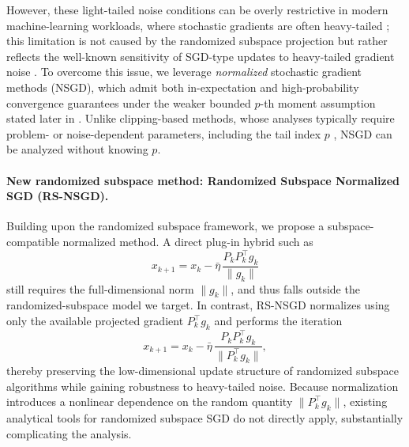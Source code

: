 \documentclass[10pt]{article}
\begin{document}
However, these light-tailed noise conditions can be overly restrictive in modern machine-learning workloads, where stochastic gradients are often heavy-tailed \cite{simsekli2019}; this limitation is not caused by the randomized subspace projection but rather reflects the well-known sensitivity of SGD-type updates to heavy-tailed gradient noise \cite{nguyen2019,hodgkinson2021}.
To overcome this issue, we leverage \emph{normalized} stochastic gradient methods (NSGD),
which admit both in-expectation and high-probability convergence guarantees under the weaker bounded $p$-th moment
assumption stated later in  \cite{huebler2025}.
Unlike clipping-based methods, whose analyses typically require problem- or noise-dependent parameters,
including the tail index $p$ \cite{zhang2020clipped,nguyen2023}, NSGD can be analyzed without knowing $p$.
\paragraph{New randomized subspace method: Randomized Subspace Normalized SGD (RS-NSGD).}
Building upon the randomized subspace framework, we propose a subspace-compatible normalized method.
A direct plug-in hybrid such as
\[
x_{k+1} = x_k - \bar{\eta}\,\frac{P_kP_k^\top g_k}{\|g_k\|}
\]
still requires the full-dimensional norm $\|g_k\|$, and thus falls outside the randomized-subspace model we target.
In contrast, RS-NSGD normalizes using only the available projected gradient $P_k^\top g_k$ and performs the iteration
\[
x_{k+1} = x_k - \bar{\eta}\,\frac{P_kP_k^\top g_k}{\|P_k^\top g_k\|},
\]
thereby preserving the low-dimensional update structure of randomized subspace algorithms while gaining robustness to
heavy-tailed noise.
Because normalization introduces a nonlinear dependence on the random quantity $\|P_k^\top g_k\|$,
existing analytical tools for randomized subspace SGD do not directly apply, substantially complicating the analysis.
\end{document}
